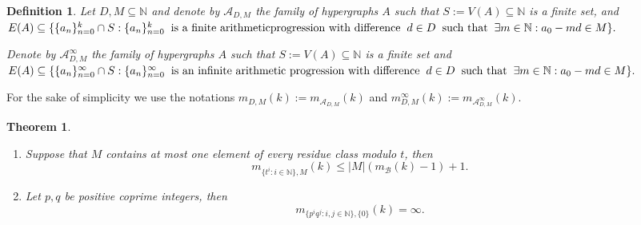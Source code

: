 \documentclass[11pt,oneside]{amsart}
\newcommand{\N}{\mathbb{N}}
\newtheorem{theorem}{Theorem}
\newtheorem{definition}{Definition}
\begin{document}
\begin{definition} 
Let $D,M \subseteq \mathbb{N}$ and denote by $\mathcal{A}_{D,M}$ the family of hypergraphs $A$ such that $S:=V(A) \subseteq \mathbb{N}$ is a finite set, and 
$E(A) \subseteq \{\{a_n\}_{n=0}^{k} \cap S:\{a_n\}_{n=0}^{k} \hspace{0.2 cm}\text{is a finite arithmetic} \newline \text{progression with difference} \hspace{0.2 cm}d \in D\hspace{0.2 cm} \text{such that}\hspace{0.2 cm}\exists m\in \N: a_0-md\in M\}.$

Denote by $\mathcal{A}_{D,M}^{\infty}$ the family of hypergraphs $A$ such that $S:=V(A) \subseteq \mathbb{N}$ is a finite set and $E(A) \subseteq \{\{a_n\}_{n=0}^{\infty} \cap S:\{a_n\}_{n=0}^{\infty} \hspace{0.2 cm}\text{is an infinite arithmetic progression with difference} \hspace{0.2 cm}d \in D\hspace{0.2 cm} \text{such that}\hspace{0.2 cm}\exists m\in \N: a_0-md\in M \}.$
\end{definition}

For the sake of simplicity we use the notations
$m_{D,M}(k):=m_{\mathcal{A}_{D,M}}(k)$ and
$m_{D,M}^\infty(k):=m_{\mathcal{A}_{D,M}^{\infty}}(k)$. 

\begin{theorem}\label{veges_sorozat}
\begin{enumerate}
    \item 
    Suppose that $M$ contains at most one element of every residue class modulo $t$, then
    \[
    m_{\{t^i:i \in \mathbb{N}\}, M}(k) \leq |M|(m_{\mathcal{B}}(k) -1) + 1.
    \]
    \item 
    Let $p,q$ be positive coprime integers, then
    \[
    m_{\{p^iq^j:i,j \in \mathbb{N}\},\{0\}}(k) = \infty.
    \]
\textbf{\textbf{}}\end{enumerate}
\end{theorem}
\end{document}
